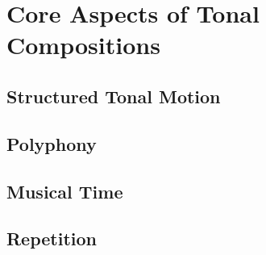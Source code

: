 \chapter{Core Aspects of Tonal Compositions}
    \section{Structured Tonal Motion}
    \section{Polyphony}
    \section{Musical Time}
    \section{Repetition}